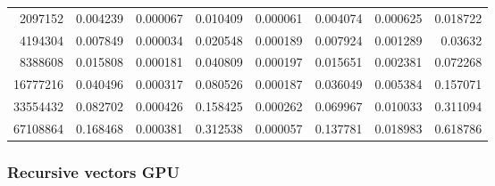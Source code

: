 \begin{tabular}{r r r r r r r r}
2097152 & 0.004239 & 0.000067 & 0.010409 & 0.000061 & 0.004074 & 0.000625 & 0.018722 \\
4194304 & 0.007849 & 0.000034 & 0.020548 & 0.000189 & 0.007924 & 0.001289 & 0.03632 \\
8388608 & 0.015808 & 0.000181 & 0.040809 & 0.000197 & 0.015651 & 0.002381 & 0.072268 \\
16777216 & 0.040496 & 0.000317 & 0.080526 & 0.000187 & 0.036049 & 0.005384 & 0.157071 \\
33554432 & 0.082702 & 0.000426 & 0.158425 & 0.000262 & 0.069967 & 0.010033 & 0.311094 \\
67108864 & 0.168468 & 0.000381 & 0.312538 & 0.000057 & 0.137781 & 0.018983 & 0.618786 \\
\end{tabular}

\subsubsection{Recursive vectors GPU}

